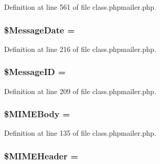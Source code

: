 Definition at line 561 of file class.\+phpmailer.\+php.

\subsubsection[{\texorpdfstring{\$\+Message\+Date}{$MessageDate}}]{\setlength{\rightskip}{0pt plus 5cm}\$Message\+Date = \textquotesingle{}\textquotesingle{}}\hypertarget{class_p_h_p_mailer_a4812372af8756f11c88ef5f7eac3b7ee}{}\label{class_p_h_p_mailer_a4812372af8756f11c88ef5f7eac3b7ee}


Definition at line 216 of file class.\+phpmailer.\+php.

\subsubsection[{\texorpdfstring{\$\+Message\+ID}{$MessageID}}]{\setlength{\rightskip}{0pt plus 5cm}\$Message\+ID = \textquotesingle{}\textquotesingle{}}\hypertarget{class_p_h_p_mailer_adf09200a8d2c3460c6b16a7ae554a69e}{}\label{class_p_h_p_mailer_adf09200a8d2c3460c6b16a7ae554a69e}


Definition at line 209 of file class.\+phpmailer.\+php.

\subsubsection[{\texorpdfstring{\$\+M\+I\+M\+E\+Body}{$MIMEBody}}]{\setlength{\rightskip}{0pt plus 5cm}\$M\+I\+M\+E\+Body = \textquotesingle{}\textquotesingle{}\hspace{0.3cm}{\ttfamily [protected]}}\hypertarget{class_p_h_p_mailer_a91bd736ba6ff85b61c24770f6bb09fda}{}\label{class_p_h_p_mailer_a91bd736ba6ff85b61c24770f6bb09fda}


Definition at line 135 of file class.\+phpmailer.\+php.

\subsubsection[{\texorpdfstring{\$\+M\+I\+M\+E\+Header}{$MIMEHeader}}]{\setlength{\rightskip}{0pt plus 5cm}\$M\+I\+M\+E\+Header = \textquotesingle{}\textquotesingle{}\hspace{0.3cm}{\ttfamily [protected]}}\hypertarget{class_p_h_p_mailer_a272ba03cd59dc9aa3a0dc74ec74daaa1}{}\label{class_p_h_p_mailer_a272ba03cd59dc9aa3a0dc74ec74daaa1}


